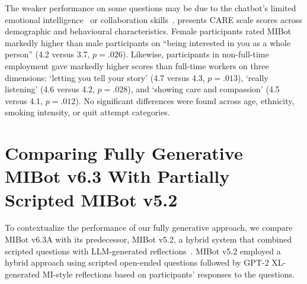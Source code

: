 The weaker performance on some questions may be due to the chatbot's limited emotional intelligence~\citep{sabour-etal-2024-emobench} or collaboration skills~\citep{yang-etal-2024-human}.  presents CARE scale scores across demographic and behavioural characteristics. Female participants rated MIBot markedly higher than male participants on ``being interested in you as a whole person'' (4.2 versus 3.7, $p = .026$). Likewise, participants in non-full-time employment gave markedly higher scores than full-time workers on three dimensions: `letting you tell your story' (4.7 versus 4.3, $p = .013$), `really listening' (4.6 versus 4.2, $p = .028$), and `showing care and compassion' (4.5 versus 4.1, $p = .012$). No significant differences were found across age, ethnicity, smoking intensity, or quit attempt categories.







\section{Comparing Fully Generative MIBot v6.3 With Partially Scripted MIBot v5.2}
\label{sec:comparison-v52}

To contextualize the performance of our fully generative approach, we compare MIBot v6.3A with its predecessor, MIBot v5.2, a hybrid system that combined scripted questions with LLM-generated reflections~\citep{brown2023mi}. MIBot v5.2 employed a hybrid approach using scripted open-ended questions followed by GPT-2 XL-generated MI-style reflections based on participants' responses to the questions.

